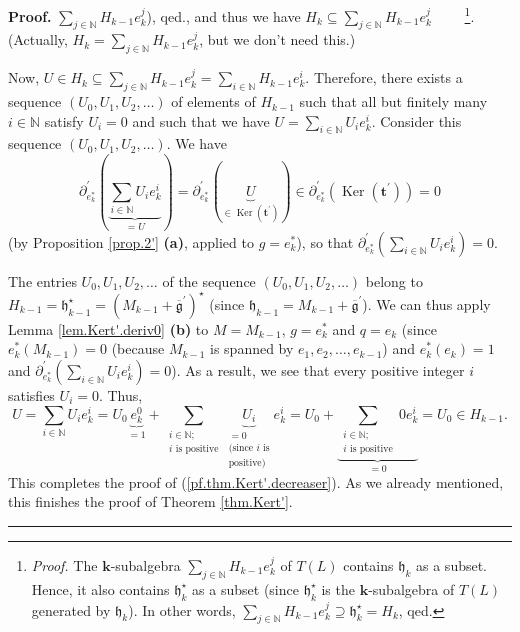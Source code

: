 \documentclass[numbers=enddot,12pt,final,onecolumn,notitlepage]{scrartcl}%
\theoremstyle{definition}
\newenvironment{proof}[1][Proof]{\noindent\textbf{#1.} }{\ \rule{0.5em}{0.5em}}
\let\sumnonlimits\sum
\renewcommand{\sum}{\sumnonlimits\limits}
\begin{document}
\begin{proof}
{$\sum_{j\in\mathbb{N}}H_{k-1}e_{k}^{j}$), qed.}, and thus we have
$H_{k}\subseteq\sum_{j\in\mathbb{N}}H_{k-1}e_{k}^{j}$%
\ \ \ \ \footnote{\textit{Proof.} The $\mathbf{k}$-subalgebra $\sum
_{j\in\mathbb{N}}H_{k-1}e_{k}^{j}$ of $T\left(  L\right)  $ contains
$\mathfrak{h}_{k}$ as a subset. Hence, it also contains $\mathfrak{h}%
_{k}^{\star}$ as a subset (since $\mathfrak{h}_{k}^{\star}$ is the
$\mathbf{k}$-subalgebra of $T\left(  L\right)  $ generated by $\mathfrak{h}%
_{k}$). In other words, $\sum_{j\in\mathbb{N}}H_{k-1}e_{k}^{j}\supseteq
\mathfrak{h}_{k}^{\star}=H_{k}$, qed.}. (Actually, $H_{k}=\sum_{j\in
\mathbb{N}}H_{k-1}e_{k}^{j}$, but we don't need this.)

Now, $U\in H_{k}\subseteq\sum_{j\in\mathbb{N}}H_{k-1}e_{k}^{j}=\sum
_{i\in\mathbb{N}}H_{k-1}e_{k}^{i}$. Therefore, there exists a sequence
$\left(  U_{0},U_{1},U_{2},\ldots\right)  $ of elements of $H_{k-1}$ such that
all but finitely many $i\in\mathbb{N}$ satisfy $U_{i}=0$ and such that we have
$U=\sum_{i\in\mathbb{N}}U_{i}e_{k}^{i}$. Consider this sequence $\left(
U_{0},U_{1},U_{2},\ldots\right)  $. We have%
\[
\partial_{e_{k}^{\ast}}^{\prime}\left(  \underbrace{\sum_{i\in\mathbb{N}}%
U_{i}e_{k}^{i}}_{=U}\right)  =\partial_{e_{k}^{\ast}}^{\prime}\left(
\underbrace{U}_{\in\operatorname*{Ker}\left(  \mathbf{t}^{\prime}\right)
}\right)  \in\partial_{e_{k}^{\ast}}^{\prime}\left(  \operatorname*{Ker}%
\left(  \mathbf{t}^{\prime}\right)  \right)  =0
\]
(by Proposition \ref{prop.2'} \textbf{(a)}, applied to $g=e_{k}^{\ast}$), so
that $\partial_{e_{k}^{\ast}}^{\prime}\left(  \sum_{i\in\mathbb{N}}U_{i}%
e_{k}^{i}\right)  =0$.

The entries $U_{0},U_{1},U_{2},\ldots$ of the sequence $\left(  U_{0}%
,U_{1},U_{2},\ldots\right)  $ belong to $H_{k-1}=\mathfrak{h}_{k-1}^{\star
}=\left(  M_{k-1}+\overline{\mathfrak{g}}^{\prime}\right)  ^{\star}$ (since
$\mathfrak{h}_{k-1}=M_{k-1}+\overline{\mathfrak{g}}^{\prime}$). We can thus
apply Lemma \ref{lem.Kert'.deriv0} \textbf{(b)} to $M=M_{k-1}$, $g=e_{k}%
^{\ast}$ and $q=e_{k}$ (since $e_{k}^{\ast}\left(  M_{k-1}\right)  =0$
(because $M_{k-1}$ is spanned by $e_{1},e_{2},\ldots,e_{k-1}$) and
$e_{k}^{\ast}\left(  e_{k}\right)  =1$ and $\partial_{e_{k}^{\ast}}^{\prime
}\left(  \sum_{i\in\mathbb{N}}U_{i}e_{k}^{i}\right)  =0$). As a result, we see
that every positive integer $i$ satisfies $U_{i}=0$. Thus,%
\[
U=\sum_{i\in\mathbb{N}}U_{i}e_{k}^{i}=U_{0}\underbrace{e_{k}^{0}}_{=1}%
+\sum_{\substack{i\in\mathbb{N};\\i\text{ is positive}}}\underbrace{U_{i}%
}_{\substack{=0\\\text{(since }i\text{ is}\\\text{positive)}}}e_{k}^{i}%
=U_{0}+\underbrace{\sum_{\substack{i\in\mathbb{N};\\i\text{ is positive}%
}}0e_{k}^{i}}_{=0}=U_{0}\in H_{k-1}.
\]
This completes the proof of (\ref{pf.thm.Kert'.decreaser}). As we already
mentioned, this finishes the proof of Theorem \ref{thm.Kert'}.
\end{proof}
\end{document}
